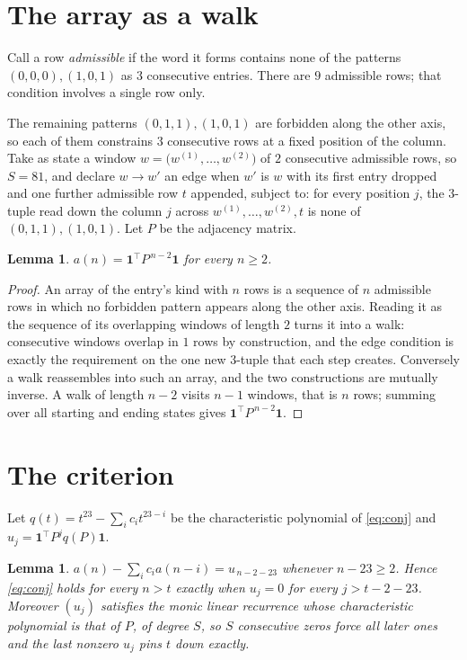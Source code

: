 \documentclass[11pt,a4paper]{article}
\theoremstyle{plain}
\newtheorem{lemma}[theorem]{Lemma}
\theoremstyle{definition}
\begin{document}
\section{The array as a walk}

Call a row \emph{admissible} if the word it forms contains none of the patterns
$(0,0,0), (1,0,1)$ as $3$ consecutive entries. There are $9$ admissible rows; that condition
involves a single row only.

The remaining patterns $(0,1,1), (1,0,1)$ are forbidden along the other axis, so each of them
constrains $3$ consecutive rows at a fixed position of the column. Take as state a
window $w=\bigl(w^{(1)},\dots,w^{(2)}\bigr)$ of $2$ consecutive admissible
rows, so $S=81$, and declare $w\to w'$ an edge when $w'$ is $w$ with its first entry
dropped and one further admissible row $t$ appended, subject to: for every position
$j$, the $3$-tuple read down the column $j$ across $w^{(1)},\dots,w^{(2)},t$
is none of $(0,1,1), (1,0,1)$. Let $P$ be the adjacency matrix.

\begin{lemma}\label{lem:walk}
$a(n)=\mathbf{1}^{\!\top}P^{\,n-2}\mathbf{1}$ for every $n\ge2$.
\end{lemma}

\begin{proof}
An array of the entry's kind with $n$ rows is a sequence of $n$ admissible rows in
which no forbidden pattern appears along the other axis. Reading it as the sequence of its
overlapping windows of length $2$ turns it into a walk: consecutive windows overlap in
$1$ rows by construction, and the edge condition is exactly the requirement on the one
new $3$-tuple that each step creates. Conversely a walk reassembles into such an array,
and the two constructions are mutually inverse. A walk of length $n-2$ visits $n-1$
windows, that is $n$ rows; summing over all starting and ending states gives
$\mathbf{1}^{\!\top}P^{\,n-2}\mathbf{1}$.
\end{proof}

\section{The criterion}

Let $q(t)=t^{23}-\sum_i c_i t^{23-i}$ be the characteristic polynomial of
\eqref{eq:conj} and $u_j=\mathbf{1}^{\!\top}P^{j}q(P)\mathbf{1}$.

\begin{lemma}\label{lem:crit}
$a(n)-\sum_i c_i a(n-i)=u_{\,n-2-23}$ whenever $n-23\ge2$. Hence
\eqref{eq:conj} holds for every $n>t$ exactly when $u_j=0$ for every
$j>t-2-23$. Moreover $(u_j)$ satisfies the monic linear recurrence whose
characteristic polynomial is that of $P$, of degree $S$, so $S$ consecutive zeros force all
later ones and the last nonzero $u_j$ pins $t$ down exactly.
\end{lemma}
\end{document}
